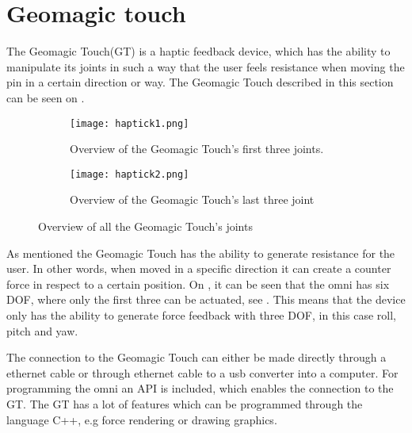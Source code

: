 \section{Geomagic touch}\label{sec:geo_magic}
The Geomagic Touch(GT) is a haptic feedback device, which has the ability to manipulate its joints in such a way that the user feels resistance when moving the pin in a certain direction or way. The Geomagic Touch described in this section can be seen on .

\begin{figure}[H]
	\centering
	\begin{subfigure}{.45\textwidth}
		\centering
		\texttt{[image: haptick1.png]}
		\caption{Overview of the Geomagic Touch's first three joints.}
		\label{fig:phantom1}
	\end{subfigure}
	\begin{subfigure}{.45\textwidth}
		\centering
		\texttt{[image: haptick2.png]}
		\caption{Overview of the Geomagic Touch's last three joint}
		\label{fig:phantom2}
	\end{subfigure}
\caption{Overview of all the Geomagic Touch's joints\cite{phantom_omni}}
\label{fig:phantom_omni}
\end{figure}

As mentioned the Geomagic Touch has the ability to generate resistance for the user. In other words, when moved in a specific direction it can create a counter force in respect to a certain position. On , it can be seen that the omni has six \gls{DOF}, where only the first three can be actuated, see . This means that the device only has the ability to generate force feedback with three \gls{DOF}, in this case roll, pitch and yaw.

The connection to the Geomagic Touch can either be made directly through a ethernet cable or through ethernet cable to a usb converter into a computer. For programming the omni an API is included, which enables the connection to the GT. The GT has a lot of features which can be programmed through the language C++, e.g force rendering or drawing graphics.
